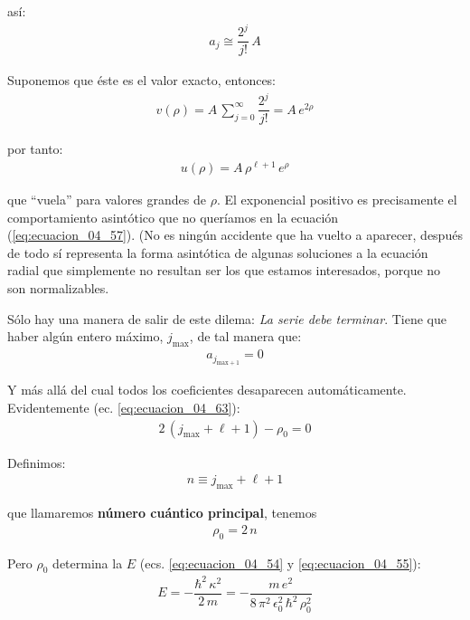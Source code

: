 así:
\begin{align}
a_{j} \cong \dfrac{2^{j}}{j!} \, A
\label{eq:ecuacion_04_64}
\end{align}

Suponemos que éste es el valor exacto, entonces:
\begin{align*}
v(\rho) = A \, \sum_{j=0}^{\infty} \dfrac{2^{j}}{j!} =  A \, e^{2 \rho}
\end{align*}

por tanto:
\begin{align}
u(\rho) = A \, \rho^{\ell + 1} \, e^{\rho}
\label{eq:ecuacion_04_65}
\end{align}

que \enquote{vuela} para valores grandes de $\rho$. El exponencial positivo es precisamente el comportamiento asintótico que no queríamos en la ecuación (\ref{eq:ecuacion_04_57}). (No es ningún accidente que ha vuelto a aparecer, después de todo sí representa la forma asintótica de algunas soluciones a la ecuación radial que simplemente no resultan ser los que estamos interesados, porque no son normalizables.
\par
Sólo hay una manera de salir de este dilema: \emph{La serie debe terminar}. Tiene que haber algún entero máximo, $j_{\text{max}}$, de tal manera que:
\begin{align}
a_{j_{\text{max} + 1}} = 0
\label{eq:ecuacion_04_66}
\end{align}

Y más allá del cual todos los coeficientes desaparecen automáticamente. Evidentemente (ec. \ref{eq:ecuacion_04_63}):
\begin{align*}
2 \, (j_{\text{max}} + \ell + 1) - \rho_{0} = 0
\end{align*}

Definimos:
\begin{align}
n \equiv j_{\text{max}} + \ell + 1
\label{eq:ecuacion_04_67}
\end{align}

que llamaremos \textbf{número cuántico principal}, tenemos
\begin{align}
\rho_{0} = 2 \, n
\label{eq:ecuacion_04_68}
\end{align}

Pero $\rho_{0}$ determina la $E$ (ecs. \ref{eq:ecuacion_04_54} y \ref{eq:ecuacion_04_55}):
\begin{align}
E = - \dfrac{\hbar^{2} \, \kappa^{2}}{2 \, m} = - \dfrac{m \, e^{2}}{8 \, \pi^{2} \, \epsilon_{0}^{2} \, \hbar^{2} \, \rho_{0}^{2}}
\label{eq:ecuacion_04_69}
\end{align}

